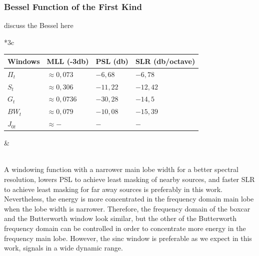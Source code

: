 \documentclass[useAMS,usenatbib]{mn2e}
\begin{document}
\subsubsection{Bessel Function of the First Kind}
discuss the Bessel here\\
\begin{tabular}{*3{c}}
 \\
 \begin{tabular}{|l|l|l|l|}
  \footnotesize Windows &\textbf{\footnotesize MLL (-3db)}&\textbf{\footnotesize PSL (db)} &\textbf{\footnotesize SLR (db/octave) }  \\
  \hline\hline
  {\footnotesize $\Pi_t$} &{\footnotesize $\approx 0,073$} &{\footnotesize $-6,68$}&{\footnotesize $-6,78$}\\
  {\footnotesize $S_t$} &{\footnotesize  $\approx0,306$}&{\footnotesize  $-11,22$}&{\footnotesize  $-12,42$} \\
  {\footnotesize $G_{t}$} & {\footnotesize $\approx0,0736$}&{\footnotesize  $-30,28$}&{\footnotesize  $-14,5$}\\ 
  {\footnotesize $BW_{t}$} &{\footnotesize  $\approx0,079$} &{\footnotesize $-10,08$ }&{\footnotesize  $-15,39$}\\
  {\footnotesize $J_{0t}$} &{\footnotesize  $\approx- $} &{\footnotesize $ -$ }&{\footnotesize  $ -$}
  \end{tabular}& \label{BDWBnoise}
\end{tabular}\\
A windowing function with a narrower main lobe width for a better spectral resolution, lowers PSL to achieve least
masking of nearby sources, and faster SLR to achieve least masking for far away sources  is preferably in this work. 
Nevertheless, the energy is more concentrated in the frequency domain main lobe when the  lobe width is narrower. Therefore, the frequency 
domain of the boxcar  and the Butterworth window look similar, but the other of the Butterworth frequency domain can be controlled in order 
to concentrate more energy in the frequency main lobe. However, the  sinc window is preferable as we expect in this work, signals in a 
wide dynamic range.
\end{document}
